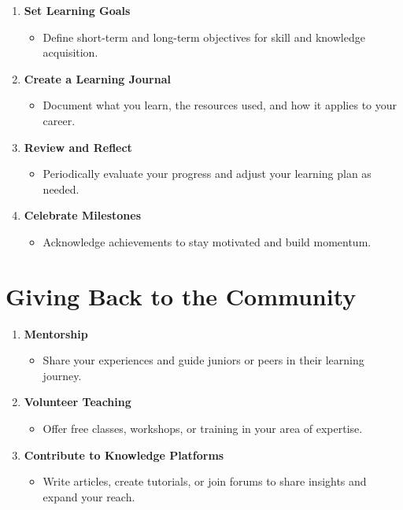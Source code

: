 \documentclass[
  letterpaper,
  DIV=11,
  numbers=noendperiod]{scrreprt}
\providecommand{\tightlist}{%
  \setlength{\itemsep}{0pt}\setlength{\parskip}{0pt}}\usepackage{longtable,booktabs,array}
\begin{document}
\begin{enumerate}
\def\labelenumi{\arabic{enumi}.}
\item
  \textbf{Set Learning Goals}

  \begin{itemize}
  \tightlist
  \item
    Define short-term and long-term objectives for skill and knowledge
    acquisition.
  \end{itemize}
\item
  \textbf{Create a Learning Journal}

  \begin{itemize}
  \tightlist
  \item
    Document what you learn, the resources used, and how it applies to
    your career.
  \end{itemize}
\item
  \textbf{Review and Reflect}

  \begin{itemize}
  \tightlist
  \item
    Periodically evaluate your progress and adjust your learning plan as
    needed.
  \end{itemize}
\item
  \textbf{Celebrate Milestones}

  \begin{itemize}
  \tightlist
  \item
    Acknowledge achievements to stay motivated and build momentum.
  \end{itemize}
\end{enumerate}

\section{Giving Back to the
Community}\label{giving-back-to-the-community}

\begin{enumerate}
\def\labelenumi{\arabic{enumi}.}
\item
  \textbf{Mentorship}

  \begin{itemize}
  \tightlist
  \item
    Share your experiences and guide juniors or peers in their learning
    journey.
  \end{itemize}
\item
  \textbf{Volunteer Teaching}

  \begin{itemize}
  \tightlist
  \item
    Offer free classes, workshops, or training in your area of
    expertise.
  \end{itemize}
\item
  \textbf{Contribute to Knowledge Platforms}

  \begin{itemize}
  \tightlist
  \item
    Write articles, create tutorials, or join forums to share insights
    and expand your reach.
  \end{itemize}
\end{enumerate}
\end{document}
